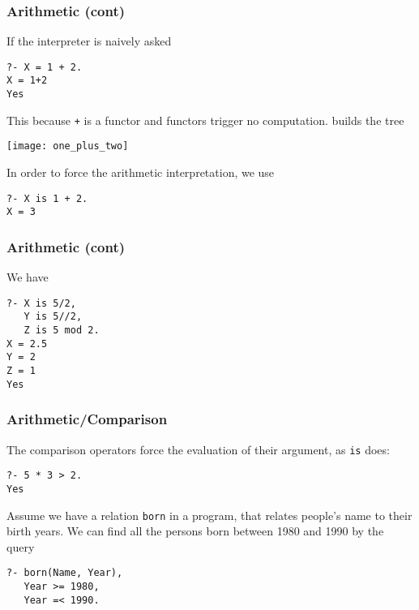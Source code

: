 %
\begin{frame}[containsverbatim]
\frametitle{Arithmetic (cont)}

If the \Prolog interpreter is naively asked
{\small
\begin{verbatim}
?- X = 1 + 2.
X = 1+2
Yes
\end{verbatim}
}
This because \texttt{+} is a functor and functors trigger no
computation. \Prolog builds the tree
\begin{center}
\texttt{[image: one\_plus\_two]}
\end{center}
In order to force the arithmetic interpretation, we use
{\small
\begin{verbatim}
?- X is 1 + 2.
X = 3
\end{verbatim}
}

\end{frame}

%
\begin{frame}[containsverbatim]
\frametitle{Arithmetic (cont)}

We have
{\small
\begin{verbatim}
?- X is 5/2, 
   Y is 5//2, 
   Z is 5 mod 2.
X = 2.5
Y = 2
Z = 1
Yes
\end{verbatim}
}

\end{frame}

%
\begin{frame}[containsverbatim]
\frametitle{Arithmetic/Comparison}

The comparison operators force the evaluation of their argument, as
\texttt{is} does:
{\small
\begin{verbatim}
?- 5 * 3 > 2.
Yes
\end{verbatim}
}
Assume we have a relation \texttt{born} in a program, that relates
people's name to their birth years. We can find all the persons born
between 1980 and 1990 by the query
{\small
\begin{verbatim}
?- born(Name, Year),
   Year >= 1980,
   Year =< 1990.
\end{verbatim}
}

\end{frame}

